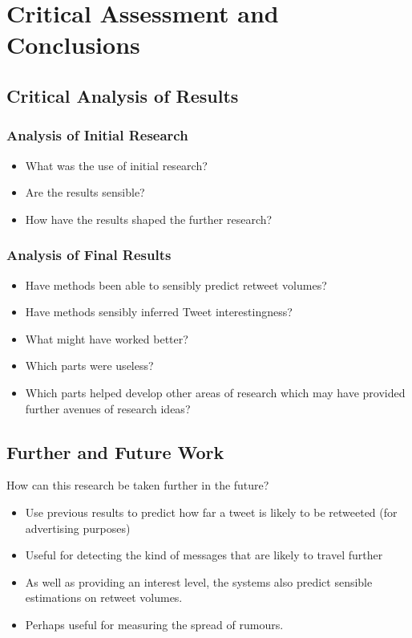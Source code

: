 \chapter{Critical Assessment and Conclusions}


\section{Critical Analysis of Results}
\subsection{Analysis of Initial Research}
\begin{itemize}
\item What was the use of initial research?
\item Are the results sensible?
\item How have the results shaped the further research?
\end{itemize}

\subsection{Analysis of Final Results}
\begin{itemize}
\item Have methods been able to sensibly predict retweet volumes?
\item Have methods sensibly inferred Tweet interestingness?
\item What might have worked better?
\item Which parts were useless?
\item Which parts helped develop other areas of research which may have provided further avenues of research ideas?
\end{itemize}


\section{Further and Future Work}
How can this research be taken further in the future?

\begin{itemize}
\item Use previous results to predict how far a tweet is likely to be retweeted (for advertising purposes)
\item Useful for detecting the kind of messages that are likely to travel further
\item As well as providing an interest level, the systems also predict sensible estimations on retweet volumes.
\item Perhaps useful for measuring the spread of rumours.
\end{itemize}

